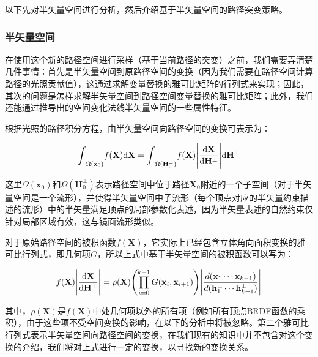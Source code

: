 以下先对半矢量空间进行分析，然后介绍基于半矢量空间的路径突变策略。





\subsubsection{半矢量空间}\label{sec:mlt-half-vector-space}
在使用这个新的路径空间进行采样（基于当前路径的突变）之前，我们需要弄清楚几件事情：首先是半矢量空间到原路径空间的变换（因为我们需要在路径空间计算路径的光照贡献值），这通过求解变量替换的雅可比矩阵的行列式来实现；因此，其次的问题是怎样求解半矢量空间到路径空间变量替换的雅可比矩阵；此外，我们还能通过推导出的空间变化法线半矢量空间的一些属性特征。

根据光照的路径积分方程，由半矢量空间向路径空间的变换可表示为：

\begin{equation}
	{\rm \int}_{\Omega(\mathbf{x}_0)}f(\mathbf{X}){\rm d}\mathbf{X}={\rm \int}_{\Omega(\mathbf{H}^{\perp}_{0})}f(\mathbf{X})\Bigg|\frac{{\rm d}\mathbf{X}}{{\rm d}\mathbf{H}^{\perp}}\Bigg| {\rm d}\mathbf{H}^{\perp}
\end{equation}

\noindent 这里$\Omega(\mathbf{x}_0)$和$\Omega(\mathbf{H}^{\perp}_{0})$表示路径空间中位于路径$\mathbf{X}_0$附近的一个子空间（对于半矢量空间是一个流形），并使得半矢量空间中子流形（每个顶点对应的半矢量约束描述的流形）中的半矢量满足顶点的局部参数化表述，因为半矢量表述的自然约束仅针对局部区域有效，这与镜面流形类似。

对于原始路径空间的被积函数$f(\mathbf{X})$，它实际上已经包含立体角向面积变换的雅可比行列式，即几何项$G$，所以上式中基于半矢量空间的被积函数可以写为：

\begin{equation}\label{e:mlt-change-of-variables}
	f(\mathbf{X})\Bigg|\frac{{\rm d}\mathbf{X}}{{\rm d}\mathbf{H}^{\perp}}\Bigg|=\rho(\mathbf{X})\Biggl(\prod^{k-1}_{i=0}G(\mathbf{x}_i,\mathbf{x}_{i+1})\Biggl)\Bigg|\frac{d(\mathbf{x}_1\cdots\mathbf{x}_{k-1})}{d(\mathbf{h}^{\perp}_1\cdots\mathbf{h}^{\perp}_{k-1})}\Bigg|
\end{equation}

\noindent 其中，$\rho(\mathbf{X})$是$f(\mathbf{X})$中处几何项以外的所有项（例如所有顶点BRDF函数的乘积），由于这些项不受空间变换的影响，在以下的分析中将被忽略。第二个雅可比行列式表示半矢量空间向路径空间的变换，在我们现有的知识中并不包含对这个变换的介绍，我们将对上式进行一定的变换，以寻找新的变换关系。

